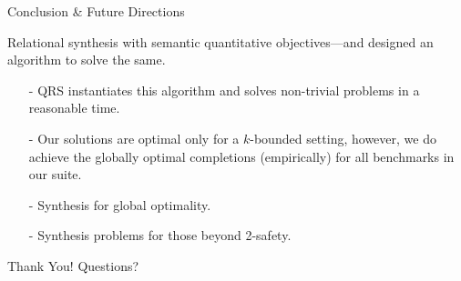 \documentclass[9pt]{beamer}
\newcommand{\tool}{\textsc{QRS}\xspace}
\begin{document}


\begin{frame}{Conclusion \& Future Directions}
    \vspace{10pt}
    \begin{tcolorbox}[
        colback=white,
        colframe=green,
        colbacktitle=white!70!green,
        coltitle=black,
        title=\textbf{New Synthesis Problem!},
        enhanced,
        attach boxed title to top left={yshift=-2mm, xshift=0.2cm},%
        ]
          Relational synthesis with semantic quantitative objectives---and designed an algorithm to solve the same.
    \end{tcolorbox}
    \pause
    \vspace{5pt}
    \begin{tcolorbox}[
        colback=white,
        colframe=blue,
        colbacktitle=white!70!blue,
        coltitle=black,
        title=\textbf{Conclusion},
        enhanced,
        attach boxed title to top left={yshift=-2mm, xshift=0.2cm},%
        ]
   \begin{itemize}
    \item[-] \tool instantiates this algorithm and solves non-trivial problems in a reasonable time.
    \item[-] Our solutions are optimal only for a $k$-bounded setting, however, we do achieve the globally optimal completions (empirically) for all benchmarks in our suite.
\end{itemize}
    \end{tcolorbox}
   \pause
   \vspace{5pt}
       \begin{tcolorbox}[
       colback=white,
       colframe=yellow!20!black,
       colbacktitle=white!70!yellow,
       coltitle=black,
       title=\textbf{Future Directions},
       enhanced,
       attach boxed title to top left={yshift=-2mm, xshift=0.2cm},%
       ]
   \begin{itemize}
    \item[-] Synthesis for global optimality.
    \item[-] Synthesis problems for those beyond 2-safety.
\end{itemize}
   \end{tcolorbox}
\end{frame}

\begin{frame}{Thank You!}
   \huge{Questions?}
\end{frame}
\end{document}
